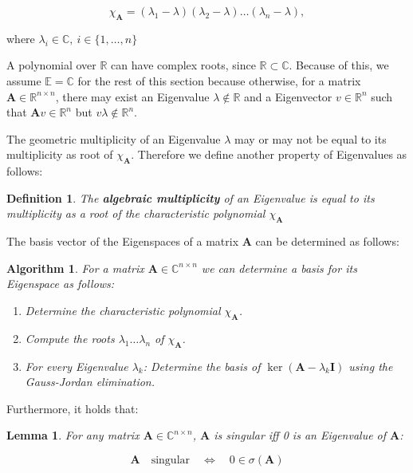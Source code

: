 \documentclass[a4paper,12pt]{article}
\newcommand{\E}{\mathbb{E}}
\newcommand{\R}{\mathbb{R}}
\newcommand{\C}{\mathbb{C}}
\newcommand{\I}{\mat{I}}
\newcommand{\A}{\mat{A}}
\newcommand{\charp}[1]{\chi_{#1}}
\newcommand{\mat}[1]{\mathbf{#1}}
\theoremstyle{plain}
\newtheorem{defn}{Definition}[section]
\newtheorem{lemma}{Lemma}[section]
\newtheorem{alg}{Algorithm}[section]
\numberwithin{equation}{section}
\begin{document}
\begin{equation*}
    \charp{\A} = (\lambda_{1} - \lambda)(\lambda_{2} - \lambda)\dots(\lambda_{n} - \lambda),
\end{equation*}

where $\lambda_{i} \in \C, \ i \in \{1, \dots, n\}$

A polynomial over $\R$ can have complex roots, since $\R \subset \C$. Because of this,
we assume $\E = \C$ for the rest of this section because otherwise, for a matrix
$\A \in \R^{n \times n}$, there may exist an Eigenvalue $\lambda \not\in \R$ and a Eigenvector
$v \in \R^{n}$ such that $\A v \in \R^{n}$ but $v \lambda \not\in \R^{n}$.

The geometric multiplicity of an Eigenvalue $\lambda$ may or may not be equal to its
multiplicity as root of $\charp{\A}$. Therefore we define another property of
Eigenvalues as follows:

\begin{defn}
    The \textbf{algebraic multiplicity} of an Eigenvalue is equal to its multiplicity
    as a root of the characteristic polynomial $\charp{\A}$
\end{defn}

The basis vector of the Eigenspaces of a matrix $\A$ can be determined as follows: \\

\begin{alg}
    For a matrix $\A \in \C^{n \times n}$ we can determine a basis for its
    Eigenspace as follows:

    \begin{enumerate}
        \item{Determine the characteristic polynomial $\charp{\A}$.}
        \item{Compute the roots $\lambda_{1} \dots \lambda_{n}$ of $\charp{\A}$.}
        \item{For every Eigenvalue $\lambda_{k}$: Determine the basis of
            $\ker (\A - \lambda_{k} \I)$ using the Gauss-Jordan elimination.}
    \end{enumerate}
\end{alg}

Furthermore, it holds that:

\begin{lemma}
    For any matrix $\A \in \C^{n \times n}$, $\A$ is singular iff 0 is an
    Eigenvalue of $\A$:

    $$ \A \quad \text{singular} \quad \iff \quad 0 \in \sigma(\A) $$
\end{lemma}
\end{document}
